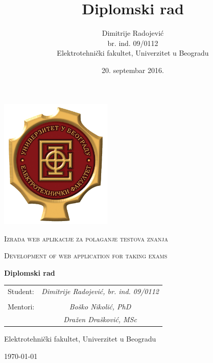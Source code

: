 \documentclass[12pt,a4paper,titlepage]{report}
\author{Dimitrije Radojević \\ br. ind. 09/0112 \\ Elektrotehnički fakultet, Univerzitet u Beogradu}
\title{Diplomski rad}
\date{20. septembar 2016.}
\begin{document}
\begin{titlepage}
\centering
\includegraphics[width=0.4\textwidth]{etf}\par
\vspace{1cm}
{\scshape\Huge Izrada web aplikacije za polaganje testova znanja \par}
\vspace{0.5cm}
{\scshape\Large Development of web application for taking exams \par}
\vspace{1cm}
{\bfseries\large Diplomski rad \par}
\vspace{1cm}

\begin{tabularx}{0.8\textwidth}{l c}
Student: \hfill & \itshape Dimitrije Radojević, br. ind. 09/0112 \\
\hfill & \hfill \\
Mentori: \hfill & \itshape Boško Nikolić, PhD \\
\hfill & \itshape Dražen Drašković, MSc
\end{tabularx}
\vfill
{Elektrotehnički fakultet, Univerzitet u Beogradu \par}
\today
\end{titlepage}
\tableofcontents





\renewcommand\bibname{Reference}
\printbibliography
\end{document}
